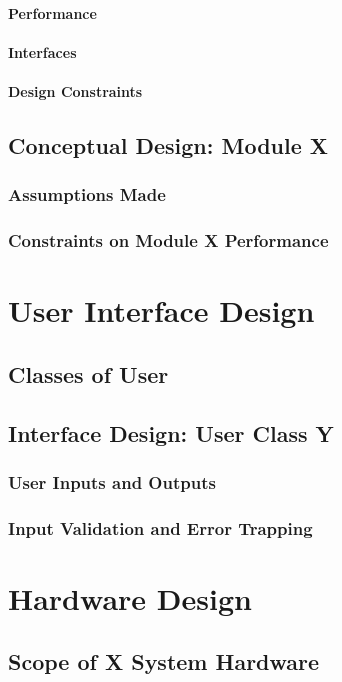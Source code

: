 \documentclass[10pt,a4paper]{report}
\begin{document}
\subsubsection{Performance}
\subsubsection{Interfaces}
\subsubsection{Design Constraints}


\section{Conceptual Design: Module X}
\subsection{Assumptions Made}
\subsection{Constraints on Module X Performance}

\chapter{User Interface Design}
\section{Classes of User}
\section{Interface Design: User Class Y}
\subsection{User Inputs and Outputs}
\subsection{Input Validation and Error Trapping}

\chapter{Hardware Design}
\section{Scope of X System Hardware}
\end{document}

